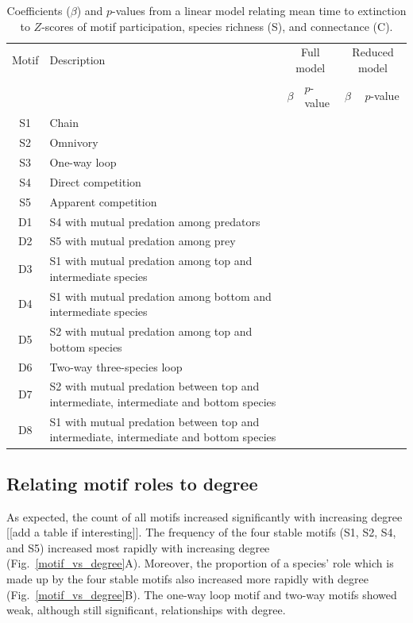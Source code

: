 \documentclass[12pt]{article}
\begin{document}
			\begin{table}
				\caption{Coefficients ($\beta$) and $p$-values from a linear model relating mean time to extinction to $Z$-scores of motif participation, species richness (S), and connectance (C). }
				\label{motif_lm}
				\begin{tabular}[h]{c | m{8cm} | l l | l l |}
				Motif & Description & \multicolumn{2}{c}{Full model} &
									\multicolumn{2}{c}{Reduced model} \\
				& & $\beta$ & $p$-value & $\beta$ & $p$-value \\
				\hline
				S1 & Chain &  \\
				S2 & Omnivory & \\
				S3 & One-way loop & \\
				S4 & Direct competition & \\
				S5 & Apparent competition & \\
				D1 & S4 with mutual predation among predators & \\
				D2 & S5 with mutual predation among prey & \\
				D3 & S1 with mutual predation among top and intermediate species & \\
				D4 & S1 with mutual predation among bottom and intermediate species & \\
				D5 & S2 with mutual predation among top and bottom species & \\
				D6 & Two-way three-species loop & \\
				D7 & S2 with mutual predation between top and intermediate, intermediate and bottom species & \\
				D8 & S1 with mutual predation between top and intermediate, intermediate and bottom species & \\
				\hline
				\end{tabular}
				\end{table}


	\subsection*{Relating motif roles to degree}

		As expected, the count of all motifs increased significantly with increasing degree [[add a table if interesting]].
		The frequency of the four stable motifs (S1, S2, S4, and S5) increased most rapidly with increasing degree (Fig.~\ref{motif_vs_degree}A).
		Moreover, the proportion of a species' role which is made up by the four stable motifs also increased more rapidly with degree (Fig.~\ref{motif_vs_degree}B).
		The one-way loop motif and two-way motifs showed weak, although still significant, relationships with degree.
\end{document}
